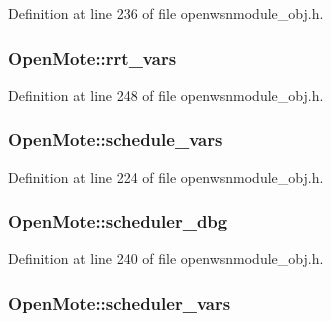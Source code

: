 Definition at line 236 of file openwsnmodule\+\_\+obj.\+h.

\subsubsection[{\texorpdfstring{rrt\+\_\+vars}{rrt_vars}}]{ Open\+Mote\+::rrt\+\_\+vars}\hypertarget{struct_open_mote_ab3971cd4d94d74662025d9551d008cbc}{}\label{struct_open_mote_ab3971cd4d94d74662025d9551d008cbc}


Definition at line 248 of file openwsnmodule\+\_\+obj.\+h.

\subsubsection[{\texorpdfstring{schedule\+\_\+vars}{schedule_vars}}]{ Open\+Mote\+::schedule\+\_\+vars}\hypertarget{struct_open_mote_a0e4d8d8851e795fcee51cabfe38259cd}{}\label{struct_open_mote_a0e4d8d8851e795fcee51cabfe38259cd}


Definition at line 224 of file openwsnmodule\+\_\+obj.\+h.

\subsubsection[{\texorpdfstring{scheduler\+\_\+dbg}{scheduler_dbg}}]{ Open\+Mote\+::scheduler\+\_\+dbg}\hypertarget{struct_open_mote_a64bbadb0cb6de192bf1aece2a5d42580}{}\label{struct_open_mote_a64bbadb0cb6de192bf1aece2a5d42580}


Definition at line 240 of file openwsnmodule\+\_\+obj.\+h.

\subsubsection[{\texorpdfstring{scheduler\+\_\+vars}{scheduler_vars}}]{ Open\+Mote\+::scheduler\+\_\+vars}\hypertarget{struct_open_mote_a09fb00669f5bb4ac598ad50f789ea03c}{}\label{struct_open_mote_a09fb00669f5bb4ac598ad50f789ea03c}


